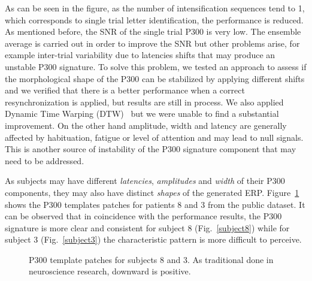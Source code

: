 \documentclass[entropy,article,submit,moreauthors,pdftex,10pt,a4paper]{mdpi}
\begin{document}
As can be seen in the figure, as the number of intensification sequences tend to 1, which corresponds to single trial letter identification, the performance is reduced. As mentioned before, the SNR of the single trial P300 is very low. The ensemble average is carried out in order to improve the SNR but other problems arise, for example inter-trial variability due to latencies shifts that may produce an unstable P300 signature. To solve this problem, we tested an approach to assess if the morphological shape of the P300 can be stabilized by applying different shifts and we verified that there is a better performance when a correct resynchronization is applied, but results are still in process.  We also applied Dynamic Time Warping (DTW)~\citep{Casarotto2005} but we were unable to find a substantial improvement.     On the other hand amplitude, width and latency are generally affected by habituation, fatigue or level of attention and may lead to null signals\citep{Ouyang2017}. This is another source of instability of the P300 signature component that may need to be addressed.

As subjects may have different \textit{latencies}, \textit{amplitudes} and \textit{width} of their P300 components, they may also have distinct \textit{shapes} of the generated ERP.  Figure~\ref{fig:p300templates} shows the P300 templates patches for patients 8 and 3 from the public dataset. It can be observed that in coincidence with the performance results, the P300 signature is more clear and consistent for subject 8 (Fig.~\ref{subject8})  while for subject 3 (Fig.~\ref{subject3}) the characteristic pattern is more difficult to perceive.

\begin{figure}[H]
\centering
{}
\caption{P300 template patches for subjects 8 and 3. As traditional done in neuroscience research, downward is positive. }
\label{fig:p300templates}
\end{figure}
\end{document}
